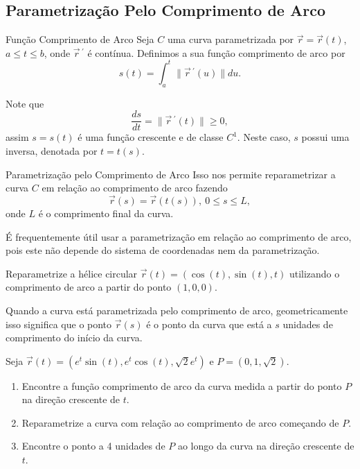 \subsection*{Parametrização Pelo Comprimento de Arco}
\begin{frame}[label=fun-vet]{Função Comprimento de Arco}
Seja $C$ uma curva parametrizada por $\vec{r}=\vec{r}(t)$, $a\leq t\leq b$, onde $\vec{r}\,^\prime$ é contínua. Definimos a sua {\color{blue} função comprimento de arco} por
\[s(t)=\int_a^t\|\vec{r}\,^\prime (u)\|du.\]

Note que 
\[\frac{ds}{dt}=\|\vec{r}\,^\prime (t)\|\geq 0,\]
assim $s=s(t)$ é uma {\color{red}função crescente} e de classe $C^1$. Neste caso, $s$ possui uma inversa, denotada por $t=t(s)$.

\end{frame}


\begin{frame}[label=fun-vet]{Parametrização pelo Comprimento de Arco}
Isso nos permite {\color{red} reparametrizar a curva $C$ em relação ao comprimento de arco} fazendo
\[\vec{r}(s)=\vec{r}(t(s)),\ 0\leq s\leq L,\]
onde $L$ é o comprimento final da curva.

\begin{block}{ }
É frequentemente útil usar a parametrização em relação ao comprimento de arco, pois este não depende do sistema de coordenadas nem da parametrização.
\end{block}
\end{frame}

\begin{frame}[label=fun-vet]
\begin{exe}
Reparametrize a hélice circular $\vec{r}(t)=(\cos(t),\sin(t),t)$ utilizando o comprimento de arco a partir do ponto $(1,0,0)$.
\end{exe}


\begin{block}{}
Quando a curva está parametrizada pelo comprimento de arco, geometricamente isso significa que o ponto $\vec{r}(s)$  é o ponto da curva que está a $s$ unidades de comprimento do início da curva.
\end{block}
\end{frame}

\begin{frame}[label=fun-vet]
\begin{casa}
Seja $\vec{r}(t)=(e^t\sin(t),e^t\cos(t),\sqrt{2}e^t)$ e $P=(0,1,\sqrt{2})$. 
\begin{enumerate}
\item Encontre a função comprimento de arco da curva medida a partir do ponto $P$ na direção crescente de $t$.
\item Reparametrize a curva com relação ao comprimento de arco começando de $P$.
\item Encontre o ponto a 4 unidades de $P$ ao longo da curva na direção crescente de $t$.
\end{enumerate}
\end{casa}
\end{frame}

